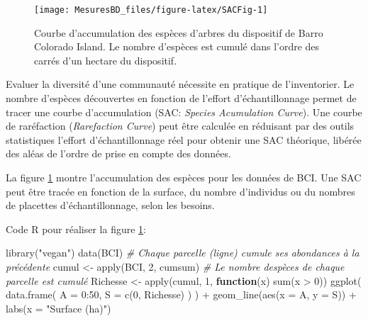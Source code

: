 \documentclass[
  11pt,
  american,
  a4paper,
  extrafontsizes,onecolumn,openright
  ]{memoir}
\newenvironment{Shaded}{\begin{snugshade}}{\end{snugshade}}
\newcommand{\AttributeTok}[1]{\textcolor[rgb]{0.77,0.63,0.00}{#1}}
\newcommand{\CommentTok}[1]{\textcolor[rgb]{0.56,0.35,0.01}{\textit{#1}}}
\newcommand{\ControlFlowTok}[1]{\textcolor[rgb]{0.13,0.29,0.53}{\textbf{#1}}}
\newcommand{\DecValTok}[1]{\textcolor[rgb]{0.00,0.00,0.81}{#1}}
\newcommand{\FunctionTok}[1]{\textcolor[rgb]{0.00,0.00,0.00}{#1}}
\newcommand{\NormalTok}[1]{#1}
\newcommand{\OtherTok}[1]{\textcolor[rgb]{0.56,0.35,0.01}{#1}}
\newcommand{\SpecialCharTok}[1]{\textcolor[rgb]{0.00,0.00,0.00}{#1}}
\newcommand{\StringTok}[1]{\textcolor[rgb]{0.31,0.60,0.02}{#1}}
\newlength{\rf}
\begin{document}
\scriptsize

\begin{figure}

{\centering \texttt{[image: MesuresBD\_files/figure-latex/SACFig-1]} 

}

\caption{Courbe d'accumulation des espèces d'arbres du dispositif de Barro Colorado Island. Le nombre d'espèces est cumulé dans l'ordre des carrés d'un hectare du dispositif.}\label{fig:SACFig}
\end{figure}

\normalsize

Evaluer la diversité d'une communauté nécessite en pratique de l'inventorier.
Le nombre d'espèces découvertes en fonction de l'effort d'échantillonnage permet de tracer une courbe d'accumulation (SAC: \emph{Species Acumulation Curve}).
Une courbe de raréfaction (\emph{Rarefaction Curve}) peut être calculée en réduisant par des outils statistiques l'effort d'échantillonnage réel pour obtenir une SAC théorique, libérée des aléas de l'ordre de prise en compte des données.

La figure \ref{fig:SACFig} montre l'accumulation des espèces pour les données de BCI.
Une SAC peut être tracée en fonction de la surface, du nombre d'individus ou du nombres de placettes d'échantillonnage, selon les besoins.

Code R pour réaliser la figure \ref{fig:SACFig}:

\scriptsize

\begin{Shaded}
\begin{Highlighting}[]
\FunctionTok{library}\NormalTok{(}\StringTok{"vegan"}\NormalTok{)}
\FunctionTok{data}\NormalTok{(BCI)}
\CommentTok{\# Chaque parcelle (ligne) cumule ses abondances à la précédente}
\NormalTok{cumul }\OtherTok{\textless{}{-}} \FunctionTok{apply}\NormalTok{(BCI, }\DecValTok{2}\NormalTok{, cumsum)}
\CommentTok{\# Le nombre d\textquotesingle{}espèces de chaque parcelle est cumulé }
\NormalTok{Richesse }\OtherTok{\textless{}{-}} \FunctionTok{apply}\NormalTok{(cumul, }\DecValTok{1}\NormalTok{, }\ControlFlowTok{function}\NormalTok{(x) }\FunctionTok{sum}\NormalTok{(x }\SpecialCharTok{\textgreater{}} \DecValTok{0}\NormalTok{))}
\FunctionTok{ggplot}\NormalTok{(}
  \FunctionTok{data.frame}\NormalTok{(}
    \AttributeTok{A =} \DecValTok{0}\SpecialCharTok{:}\DecValTok{50}\NormalTok{, }
    \AttributeTok{S =} \FunctionTok{c}\NormalTok{(}\DecValTok{0}\NormalTok{, Richesse)}
\NormalTok{  )}
\NormalTok{) }\SpecialCharTok{+}
  \FunctionTok{geom\_line}\NormalTok{(}\FunctionTok{aes}\NormalTok{(}\AttributeTok{x =}\NormalTok{ A, }\AttributeTok{y =}\NormalTok{ S)) }\SpecialCharTok{+}
  \FunctionTok{labs}\NormalTok{(}\AttributeTok{x =} \StringTok{"Surface (ha)"}\NormalTok{)}
\end{Highlighting}
\end{Shaded}
\end{document}
